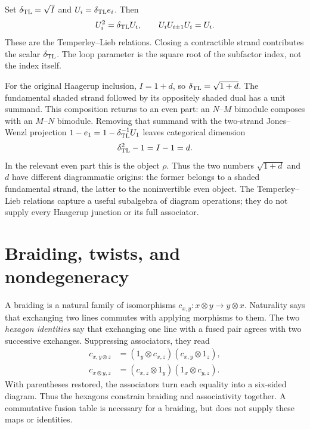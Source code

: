 Set $\delta_{\rm TL}=\sqrt I$ and
$U_i=\delta_{\rm TL}e_i$.  Then
\begin{equation}
 U_i^2=\delta_{\rm TL}U_i,\qquad
 U_iU_{i\pm1}U_i=U_i.
 \label{eq:TL-normalization}
\end{equation}
These are the Temperley--Lieb relations.  Closing a contractible
strand contributes the scalar $\delta_{\rm TL}$.  The loop
parameter is the square root of the subfactor index, not the
index itself.

\begin{example}
For the original Haagerup inclusion,
$I=1+d$, so $\delta_{\rm TL}=\sqrt{1+d}$.  The fundamental
shaded strand followed by its oppositely shaded dual has a unit
summand.  This composition returns to an even part: an $N$--$M$
bimodule composes with an $M$--$N$ bimodule.  Removing
that summand with the two-strand Jones--Wenzl projection
$1-e_1=1-\delta_{\rm TL}^{-1}U_1$ leaves categorical dimension
\[
 \delta_{\rm TL}^2-1=I-1=d.
\]
In the relevant even part this is the object $\rho$.  Thus the
two numbers $\sqrt{1+d}$ and $d$ have different diagrammatic
origins: the former belongs to a shaded fundamental strand, the
latter to the noninvertible even object.  The Temperley--Lieb
relations capture a useful subalgebra of diagram operations;
they do not supply every Haagerup junction or its full associator.
\end{example}

\section{Braiding, twists, and nondegeneracy}

A braiding is a natural family of isomorphisms
$c_{x,y}:x\otimes y\to y\otimes x$. Naturality says that exchanging
two lines commutes with applying morphisms to them. The two
\emph{hexagon identities} say that exchanging one line with a fused
pair agrees with two successive exchanges. Suppressing associators,
they read
\begin{align*}
 c_{x,y\otimes z}&=(1_y\otimes c_{x,z})(c_{x,y}\otimes1_z),\\
 c_{x\otimes y,z}&=(c_{x,z}\otimes1_y)(1_x\otimes c_{y,z}).
\end{align*}
With parentheses restored, the associators turn each equality into
a six-sided diagram. Thus the hexagons constrain braiding and
associativity together. A commutative fusion table is necessary for
a braiding, but does not supply these maps or identities.

